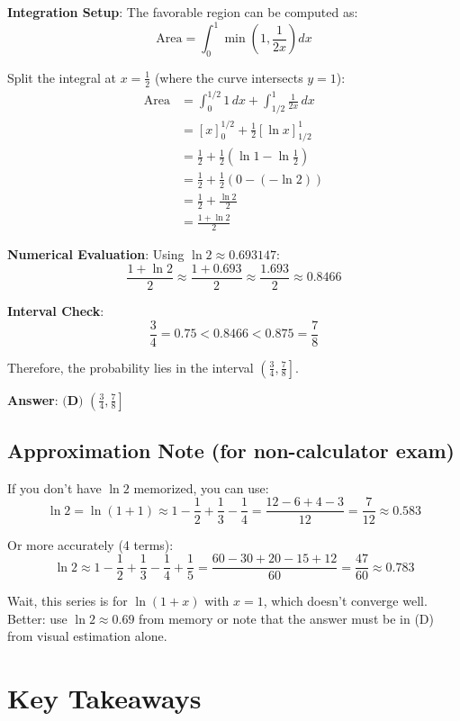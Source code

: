 \documentclass[11pt]{article}
\begin{document}
\textbf{Integration Setup}: The favorable region can be computed as:
\[\text{Area} = \int_0^1 \min\left(1, \frac{1}{2x}\right) dx\]

Split the integral at $x = \frac{1}{2}$ (where the curve intersects $y = 1$):
\begin{align*}
\text{Area} &= \int_0^{1/2} 1 \, dx + \int_{1/2}^1 \frac{1}{2x} \, dx \\
&= \left[x\right]_0^{1/2} + \frac{1}{2}\left[\ln x\right]_{1/2}^1 \\
&= \frac{1}{2} + \frac{1}{2}(\ln 1 - \ln \frac{1}{2}) \\
&= \frac{1}{2} + \frac{1}{2}(0 - (-\ln 2)) \\
&= \frac{1}{2} + \frac{\ln 2}{2} \\
&= \frac{1 + \ln 2}{2}
\end{align*}

\textbf{Numerical Evaluation}: Using $\ln 2 \approx 0.693147$:
\[\frac{1 + \ln 2}{2} \approx \frac{1 + 0.693}{2} \approx \frac{1.693}{2} \approx 0.8466\]

\textbf{Interval Check}: 
\[\frac{3}{4} = 0.75 < 0.8466 < 0.875 = \frac{7}{8}\]

Therefore, the probability lies in the interval $\left(\frac{3}{4}, \frac{7}{8}\right]$.

\textbf{Answer}: $\boxed{\textbf{(D) } \left(\frac{3}{4}, \frac{7}{8}\right]}$

\subsection*{Approximation Note (for non-calculator exam)}

If you don't have $\ln 2$ memorized, you can use:
\[\ln 2 = \ln(1+1) \approx 1 - \frac{1}{2} + \frac{1}{3} - \frac{1}{4} = \frac{12-6+4-3}{12} = \frac{7}{12} \approx 0.583\]

Or more accurately (4 terms):
\[\ln 2 \approx 1 - \frac{1}{2} + \frac{1}{3} - \frac{1}{4} + \frac{1}{5} = \frac{60-30+20-15+12}{60} = \frac{47}{60} \approx 0.783\]

Wait, this series is for $\ln(1+x)$ with $x=1$, which doesn't converge well. Better: use $\ln 2 \approx 0.69$ from memory or note that the answer must be in (D) from visual estimation alone.

\section*{Key Takeaways}
\end{document}

